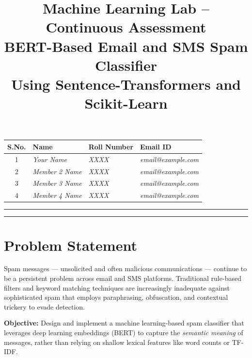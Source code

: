 \documentclass[12pt,a4paper]{article}
\title{
    \vspace{-1cm}
    \textbf{\Large Machine Learning Lab -- Continuous Assessment}\\[0.5cm]
    \textbf{\LARGE BERT-Based Email and SMS Spam Classifier}\\[0.3cm]
    \large Using Sentence-Transformers and Scikit-Learn
}
\author{}
\date{}
\begin{document}
\maketitle
\thispagestyle{empty}

\vspace{-0.5cm}
\begin{center}
\renewcommand{\arraystretch}{1.5}
\begin{tabular}{|c|l|l|l|}
\hline
\textbf{S.No.} & \textbf{Name} & \textbf{Roll Number} & \textbf{Email ID} \\
\hline
1 & \textit{Your Name}         & \textit{XXXX}  & \textit{email@example.com} \\
\hline
2 & \textit{Member 2 Name}     & \textit{XXXX}  & \textit{email@example.com} \\
\hline
3 & \textit{Member 3 Name}     & \textit{XXXX}  & \textit{email@example.com} \\
\hline
4 & \textit{Member 4 Name}     & \textit{XXXX}  & \textit{email@example.com} \\
\hline
\end{tabular}
\end{center}

\vspace{0.5cm}
\hrule
\vspace{0.3cm}
\tableofcontents
\vspace{0.3cm}
\hrule

\newpage

\section{Problem Statement}

Spam messages --- unsolicited and often malicious communications --- continue to be a persistent problem across email and SMS platforms. Traditional rule-based filters and keyword matching techniques are increasingly inadequate against sophisticated spam that employs paraphrasing, obfuscation, and contextual trickery to evade detection.

\textbf{Objective:} Design and implement a machine learning-based spam classifier that leverages deep learning embeddings (BERT) to capture the \textit{semantic meaning} of messages, rather than relying on shallow lexical features like word counts or TF-IDF.
\end{document}
